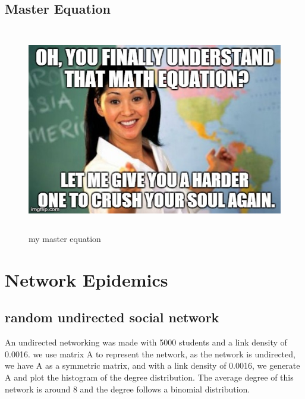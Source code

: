 \documentclass[12pt]{article}
\begin{document}
\newpage
\subsection{Master Equation}

\begin{figure}[H] %
\centering
\includegraphics[width = 12 cm, height = 9cm]{memes.jpg}
\caption{my master equation}
\label{fig:meme}
\end{figure}





\newpage
\section{Network Epidemics}
\doublespacing

\subsection{random undirected social network}

An undirected networking was made with 5000 students and a link density of 0.0016. we use matrix A to represent the network, as the network is undirected, we have A as a symmetric matrix, and with a link density of 0.0016, we generate A and plot the histogram of the degree distribution. The average degree of this network is around 8 and the degree follows a binomial distribution. 
\end{document}
